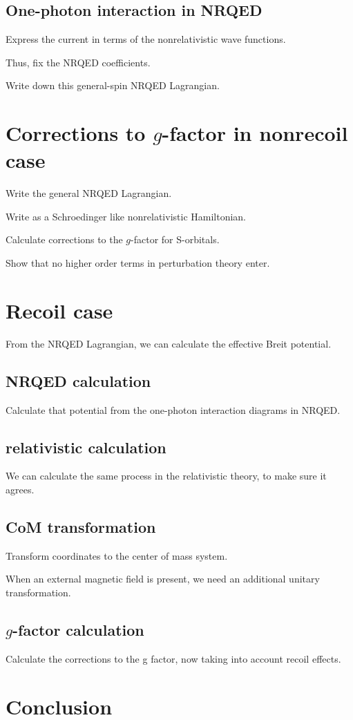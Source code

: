 \documentclass[12pt]{article}
\begin{document}
\subsection{One-photon interaction in NRQED}
Express the current in terms of the nonrelativistic wave functions.

Thus, fix the NRQED coefficients.

Write down this general-spin NRQED Lagrangian.
















\section{Corrections to $g$-factor in nonrecoil case}

Write the general NRQED Lagrangian.

Write as a Schroedinger like nonrelativistic Hamiltonian.

Calculate corrections to the $g$-factor for S-orbitals.

Show that no higher order terms in perturbation theory enter.


\section{Recoil case}
From the NRQED Lagrangian, we can calculate the effective Breit potential.

\subsection{NRQED calculation}
Calculate that potential from the one-photon interaction diagrams in NRQED.

\subsection{relativistic calculation}
We can calculate the same process in the relativistic theory, to make sure it agrees.

\subsection{CoM transformation}
Transform coordinates to the center of mass system.

When an external magnetic field is present, we need an additional unitary transformation.

\subsection{$g$-factor calculation}

Calculate the corrections to the g factor, now taking into account recoil effects.


\section{Conclusion}
\end{document}
